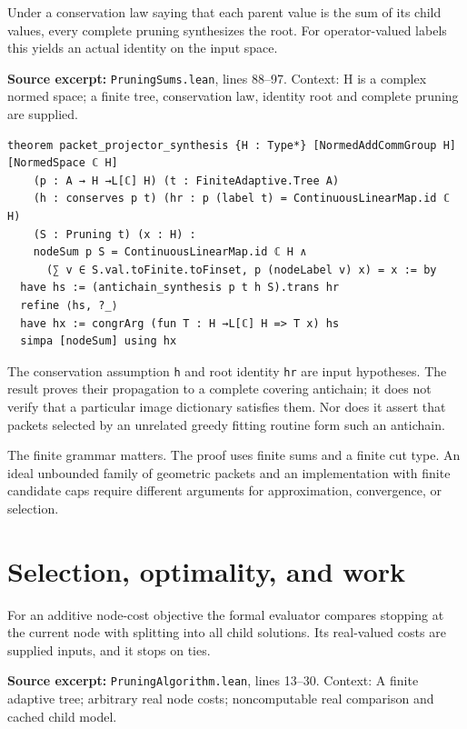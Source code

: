 \documentclass[11pt]{article}
\begin{document}
Under a conservation law saying that each parent value is the sum of its child values, every complete pruning synthesizes the root. For operator-valued labels this yields an actual identity on the input space.

\textbf{Source excerpt:} \texttt{PruningSums.lean}, lines 88--97. Context: H is a complex normed space; a finite tree, conservation law, identity root and complete pruning are supplied.

\begin{minipage}{\linewidth}
\begin{lstlisting}
theorem packet_projector_synthesis {H : Type*} [NormedAddCommGroup H] [NormedSpace ℂ H]
    (p : A → H →L[ℂ] H) (t : FiniteAdaptive.Tree A)
    (h : conserves p t) (hr : p (label t) = ContinuousLinearMap.id ℂ H)
    (S : Pruning t) (x : H) :
    nodeSum p S = ContinuousLinearMap.id ℂ H ∧
      (∑ v ∈ S.val.toFinite.toFinset, p (nodeLabel v) x) = x := by
  have hs := (antichain_synthesis p t h S).trans hr
  refine ⟨hs, ?_⟩
  have hx := congrArg (fun T : H →L[ℂ] H => T x) hs
  simpa [nodeSum] using hx
\end{lstlisting}
\end{minipage}\par

The conservation assumption \texttt{h} and root identity \texttt{hr} are input hypotheses. The result proves their propagation to a complete covering antichain; it does not verify that a particular image dictionary satisfies them. Nor does it assert that packets selected by an unrelated greedy fitting routine form such an antichain.

The finite grammar matters. The proof uses finite sums and a finite cut type. An ideal unbounded family of geometric packets and an implementation with finite candidate caps require different arguments for approximation, convergence, or selection.

\hypertarget{selection-optimality-and-work}{%
\section{Selection, optimality, and work}\label{selection-optimality-and-work}}

For an additive node-cost objective the formal evaluator compares stopping at the current node with splitting into all child solutions. Its real-valued costs are supplied inputs, and it stops on ties.

\textbf{Source excerpt:} \texttt{PruningAlgorithm.lean}, lines 13--30. Context: A finite adaptive tree; arbitrary real node costs; noncomputable real comparison and cached child model.
\end{document}
